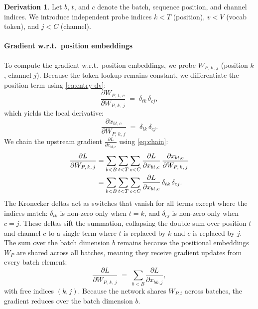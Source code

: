 \documentclass[letterpaper, 10 pt, conference]{ieeeconf}
\newcommand{\pdv}[2]{\frac{\partial #1}{\partial #2}}
\newcommand{\dL}[1]{\pdv{L}{#1}}
\newcommand{\kron}[2]{\delta_{#1 #2}}
\theoremstyle{definition}
\newtheorem*{derivation}{Derivation}
\begin{document}
\begin{derivation}
  Let $b$, $t$, and $c$ denote the batch, sequence position, and channel indices. We introduce independent probe indices $k < T$ (position), $v < V$ (vocab token), and $j < C$ (channel).

  \paragraph{Gradient w.r.t.\ position embeddings}
  To compute the gradient w.r.t.\ position embeddings, we probe $W_{P,\, k,\, j}$ (position $k$, channel $j$). Because the token lookup remains constant, we differentiate the position term using \eqref{eq:entry-dv}:
  \begin{equation}
    \pdv{W_{P,\, t,\, c}}{W_{P,\, k,\, j}} \;=\; \kron{t}{k}\,\kron{c}{j},
    \label{eq:enc-dxdwp-local}
  \end{equation}
  which yields the local derivative:
  \begin{equation}
    \pdv{x_{bt, c}}{W_{P,\, k,\, j}} \;=\; \kron{t}{k}\,\kron{c}{j}.
    \label{eq:enc-dxdwp}
  \end{equation}
  We chain the upstream gradient $\dL{x_{bt, c}}$ using \eqref{eq:chain}:
  \begin{align}
    \dL{W_{P,\, k,\, j}}
     & = \sum_{b<B} \sum_{t<T} \sum_{c<C} \dL{x_{bt, c}}\,\pdv{x_{bt, c}}{W_{P,\, k,\, j}} \notag \\
     & = \sum_{b<B} \sum_{t<T} \sum_{c<C} \dL{x_{bt, c}}\,\kron{t}{k}\,\kron{c}{j}.
  \end{align}
  The Kronecker deltas act as switches that vanish for all terms except where the indices match: $\kron{t}{k}$ is non-zero only when $t = k$, and $\kron{c}{j}$ is non-zero only when $c = j$. These deltas sift the summation, collapsing the double sum over position $t$ and channel $c$ to a single term where $t$ is replaced by $k$ and $c$ is replaced by $j$. The sum over the batch dimension $b$ remains because the positional embeddings $W_P$ are shared across all batches, meaning they receive gradient updates from every batch element:
  \begin{equation}
    \dL{W_{P,\, k,\, j}} \;=\; \sum_{b<B} \dL{x_{bk, j}},
    \label{eq:enc-wp-bwd-idx}
  \end{equation}
  with free indices $(k, j)$. Because the network shares $W_{P, t}$ across batches, the gradient reduces over the batch dimension $b$.


\end{derivation}
\end{document}
